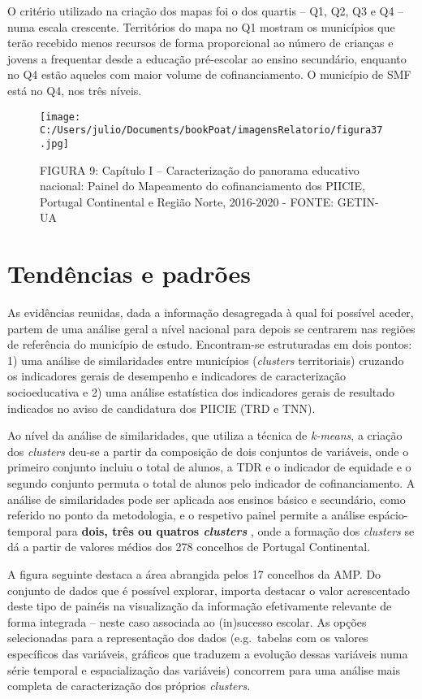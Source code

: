 \documentclass[
]{book}
\begin{document}
O critério utilizado na criação dos mapas foi o dos quartis -- Q1, Q2, Q3 e Q4 -- numa escala crescente. Territórios do mapa no Q1 mostram os municípios que terão recebido menos recursos de forma proporcional ao número de crianças e jovens a frequentar desde a educação pré-escolar ao ensino secundário, enquanto no Q4 estão aqueles com maior volume de cofinanciamento. O município de SMF está no Q4, nos três níveis.

\begin{figure}
\centering
\texttt{[image: C:/Users/julio/Documents/bookPoat/imagensRelatorio/figura37.jpg]}
\caption{FIGURA 9: Capítulo I -- Caracterização do panorama educativo nacional: Painel do Mapeamento do cofinanciamento dos PIICIE, Portugal Continental e Região Norte, 2016-2020 - FONTE: GETIN-UA}
\end{figure}

\hypertarget{tenduxeancias-e-padruxf5es}{%
\section{\texorpdfstring{\textbf{Tendências e padrões}}{Tendências e padrões}}\label{tenduxeancias-e-padruxf5es}}

As evidências reunidas, dada a informação desagregada à qual foi possível aceder, partem de uma análise geral a nível nacional para depois se centrarem nas regiões de referência do município de estudo. Encontram-se estruturadas em dois pontos: 1) uma análise de similaridades entre municípios (\emph{clusters} territoriais) cruzando os indicadores gerais de desempenho e indicadores de caracterização socioeducativa e 2) uma análise estatística dos indicadores gerais de resultado indicados no aviso de candidatura dos PIICIE (TRD e TNN).

Ao nível da análise de similaridades, que utiliza a técnica de \emph{k-means}, a criação dos \emph{clusters} deu-se a partir da composição de dois conjuntos de variáveis, onde o primeiro conjunto incluiu o total de alunos, a TDR e o indicador de equidade e o segundo conjunto permuta o total de alunos pelo indicador de cofinanciamento. A análise de similaridades pode ser aplicada aos ensinos básico e secundário, como referido no ponto da metodologia, e o respetivo painel permite a análise espácio-temporal para \textbf{dois, três ou quatros \emph{clusters} }, onde a formação dos \emph{clusters} se dá a partir de valores médios dos 278 concelhos de Portugal Continental.

A figura seguinte destaca a área abrangida pelos 17 concelhos da AMP. Do conjunto de dados que é possível explorar, importa destacar o valor acrescentado deste tipo de painéis na visualização da informação efetivamente relevante de forma integrada -- neste caso associada ao (in)sucesso escolar. As opções selecionadas para a representação dos dados (e.g.~tabelas com os valores específicos das variáveis, gráficos que traduzem a evolução dessas variáveis numa série temporal e espacialização das variáveis) concorrem para uma análise mais completa de caracterização dos próprios \emph{clusters}.
\end{document}
